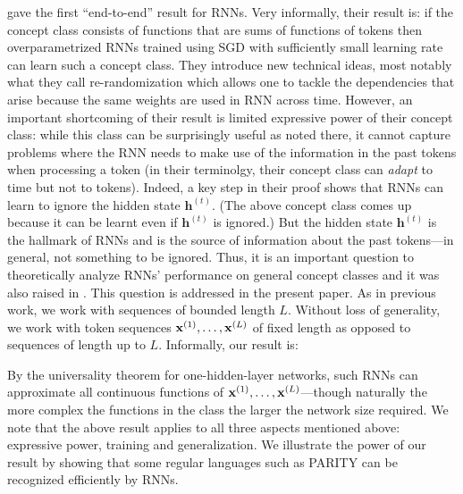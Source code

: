\cite{allen2019can} gave the first ``end-to-end'' result for RNNs. Very informally, their result is: if the concept class consists of functions that are sums of functions of tokens then overparametrized RNNs trained using SGD with sufficiently small learning rate can learn such a concept class. They introduce new technical ideas, most notably what they call re-randomization which allows one to tackle the dependencies that arise because the same weights are used in RNN across time. %
However, an important shortcoming of their result is limited expressive power of their concept class: %
while this class can be surprisingly useful as noted there, 
it cannot capture problems where the RNN needs to make use of the information in the past tokens when processing a token (in their terminolgy, their concept class can \emph{adapt} to time but not to tokens). Indeed, a key step in their proof shows that RNNs can learn to ignore the hidden state $\mathbf{h}^{(t)}$. (The above concept class comes up because it can be learnt even if $\mathbf{h}^{(t)}$ is ignored.) But the hidden state $\mathbf{h}^{(t)}$ is the hallmark of RNNs and 
is the source of information about the past tokens---in general, not something to be ignored. 
Thus, it is an important question to theoretically analyze RNNs' performance on general concept classes and it was also raised in \cite{allen2019can}. This question is addressed in the present paper. As in previous work, we work with sequences of bounded length $L$. Without loss of generality, we work with token sequences $\mathbf{x}^{(1)}, \ldots, \mathbf{x}^{(L)}$ of fixed length as opposed to sequences of length up to $L$.
Informally, our result is:
\vspace{-5pt}
\begin{center}
\end{center}
 By the universality theorem for one-hidden-layer networks, 
  such RNNs can approximate all continuous functions of $\mathbf{x}^{(1)}, \ldots, \mathbf{x}^{(L)}$---though naturally the more complex the functions in the class the larger the network size required. We note that the above result applies to all three aspects mentioned above: expressive power, training and generalization. %
We illustrate the power of our result by showing that some regular languages such as PARITY can be recognized efficiently by RNNs.



